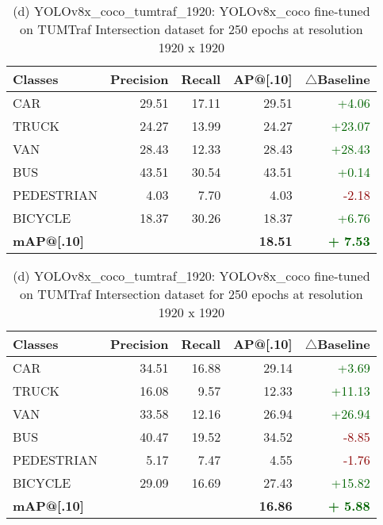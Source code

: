 \begin{table}[htbp]
	\vspace{15pt}
	
	\begin{minipage}[t]{0.48\textwidth}
		\centering
		\scriptsize
		\setlength\tabcolsep{4pt}
		\begin{tabular}{lrrrr}
			\toprule
			\textbf{Classes} & \textbf{Precision} & \textbf{Recall} & \textbf{AP@[.10]} & \textbf{$\triangle$Baseline} \\
			\midrule
			CAR & 29.51 & 17.11 & 29.51 & \textcolor{darkgreen}{+4.06} \\
			TRUCK & 24.27 & 13.99 & 24.27 & \textcolor{darkgreen}{+23.07} \\
			VAN & 28.43 & 12.33 & 28.43 & \textcolor{darkgreen}{+28.43} \\
			BUS & 43.51 & 30.54 & 43.51 & \textcolor{darkgreen}{+0.14} \\
			PEDESTRIAN & 4.03 & 7.70 & 4.03 & \textcolor{darkred}{-2.18} \\
			BICYCLE & 18.37 & 30.26 & 18.37 & \textcolor{darkgreen}{+6.76}\\
			\midrule
			\textbf{mAP@[.10]} & \textbf{} & \textbf{} & \textbf{18.51} &  \textbf{\textcolor{darkgreen}{+ 7.53}} \\
			\bottomrule
		\end{tabular}
		\caption*{(c) YOLOv8x\_tumtraf: trained on TUMTraf Intersection dataset for 250 epochs at resolution 1920 x 1920}
	\end{minipage}
	\hfill
	\begin{minipage}[t]{0.48\textwidth}
		\centering
		\scriptsize
		\setlength\tabcolsep{4pt}
		\begin{tabular}{lrrrr}
			\toprule
			\textbf{Classes} & \textbf{Precision} & \textbf{Recall} & \textbf{AP@[.10]} & \textbf{$\triangle$Baseline} \\
			\midrule
			CAR & 34.51 & 16.88 & 29.14 &  \textcolor{darkgreen}{+3.69}\\
			TRUCK & 16.08 & 9.57 & 12.33 &  \textcolor{darkgreen}{+11.13}\\
			VAN & 33.58 & 12.16 & 26.94 & \textcolor{darkgreen}{+26.94}\\
			BUS & 40.47 & 19.52 & 34.52 & \textcolor{darkred}{-8.85}\\
			PEDESTRIAN & 5.17 & 7.47 & 4.55 &  \textcolor{darkred}{-1.76}\\
			BICYCLE & 29.09 & 16.69 & 27.43 &  \textcolor{darkgreen}{+15.82}\\
			\midrule
			\textbf{mAP@[.10]} &  &  & \textbf{16.86}  &  \textbf{\textcolor{darkgreen}{+ 5.88}} \\
			\bottomrule
		\end{tabular}
		\caption*{(d) YOLOv8x\_coco\_tumtraf\_1920: YOLOv8x\_coco fine-tuned on TUMTraf Intersection dataset for 250 epochs at resolution 1920 x 1920}
	\end{minipage}
	

\end{table}

